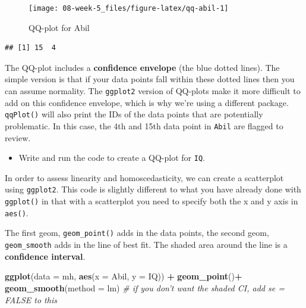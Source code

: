 \documentclass[]{book}
\newenvironment{Shaded}{\begin{snugshade}}{\end{snugshade}}
\newcommand{\CommentTok}[1]{\textcolor[rgb]{0.56,0.35,0.01}{\textit{#1}}}
\newcommand{\DataTypeTok}[1]{\textcolor[rgb]{0.13,0.29,0.53}{#1}}
\newcommand{\KeywordTok}[1]{\textcolor[rgb]{0.13,0.29,0.53}{\textbf{#1}}}
\newcommand{\NormalTok}[1]{#1}
\newcommand{\OperatorTok}[1]{\textcolor[rgb]{0.81,0.36,0.00}{\textbf{#1}}}
\newcommand{\StringTok}[1]{\textcolor[rgb]{0.31,0.60,0.02}{#1}}
\providecommand{\tightlist}{%
  \setlength{\itemsep}{0pt}\setlength{\parskip}{0pt}}
\begin{document}
\begin{Shaded}
\end{Shaded}

\begin{figure}

{\centering \texttt{[image: 08-week-5\_files/figure-latex/qq-abil-1]} 

}

\caption{QQ-plot for Abil}\label{fig:qq-abil}
\end{figure}

\begin{verbatim}
## [1] 15  4
\end{verbatim}

The QQ-plot includes a \textbf{confidence envelope} (the blue dotted lines). The simple version is that if your data points fall within these dotted lines then you can assume normality. The \texttt{ggplot2} version of QQ-plots make it more difficult to add on this confidence envelope, which is why we're using a different package. \texttt{qqPlot()} will also print the IDs of the data points that are potentially problematic. In this case, the 4th and 15th data point in \texttt{Abil} are flagged to review.

\begin{itemize}
\tightlist
\item
  Write and run the code to create a QQ-plot for \texttt{IQ}.
\end{itemize}

In order to assess linearity and homoscedasticity, we can create a scatterplot using \texttt{ggplot2}. This code is slightly different to what you have already done with \texttt{ggplot()} in that with a scatterplot you need to specify both the x and y axis in \texttt{aes()}.

The first geom, \texttt{geom\_point()} adds in the data points, the second geom, \texttt{geom\_smooth} adds in the line of best fit. The shaded area around the line is a \textbf{confidence interval}.

\begin{Shaded}
\begin{Highlighting}[]
\KeywordTok{ggplot}\NormalTok{(}\DataTypeTok{data =}\NormalTok{ mh, }\KeywordTok{aes}\NormalTok{(}\DataTypeTok{x =}\NormalTok{ Abil, }\DataTypeTok{y =}\NormalTok{ IQ)) }\OperatorTok{+}
\StringTok{  }\KeywordTok{geom_point}\NormalTok{()}\OperatorTok{+}
\StringTok{  }\KeywordTok{geom_smooth}\NormalTok{(}\DataTypeTok{method =}\NormalTok{ lm) }\CommentTok{# if you don't want the shaded CI, add se = FALSE to this}
\end{Highlighting}
\end{Shaded}
\end{document}
